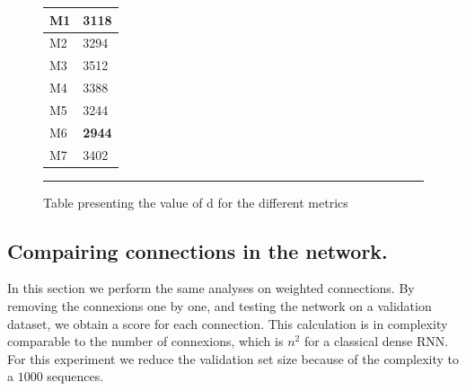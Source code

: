 \begin{figure}[htbp]
    \centering
    \begin{tabular}{|l|l|}
        \hline
        M1 & 3118 \\ \hline
        M2 & 3294 \\ \hline
        M3 & 3512 \\ \hline
        M4 & 3388 \\ \hline
        M5 & 3244 \\ \hline
        M6 & \textbf{2944} \\ \hline
        M7 & 3402 \\
        \hline
    \end{tabular}
    \label{fig:metrics}
    \rule{35em}{0.5pt}
    \caption[Table presenting the value of d for the different metrics ]{Table presenting the value of d for the different metrics}
\end{figure}



\subsection{Compairing connections in the network.}

In this section we perform the same analyses on weighted connections. By removing the connexions one by one, and testing the network on a validation dataset, we obtain a score for each connection. This calculation is in complexity comparable to the number of connexions, which is $n ^2$ for a classical dense RNN. For this experiment we reduce the validation set size because of the complexity to a $1000$ sequences.
